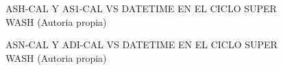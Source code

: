 \begin{figure}[H]
  \hfill
  \hfill
  \hfill
  \caption{ASH-CAL Y AS1-CAL VS DATETIME EN EL CICLO SUPER WASH (Autoria propia)}
  \end{figure}
\begin{figure}[H]
  \hfill
  \hfill
  \hfill
  \caption{ASN-CAL Y ADI-CAL VS DATETIME EN EL CICLO SUPER WASH (Autoria propia)}
  \end{figure}
